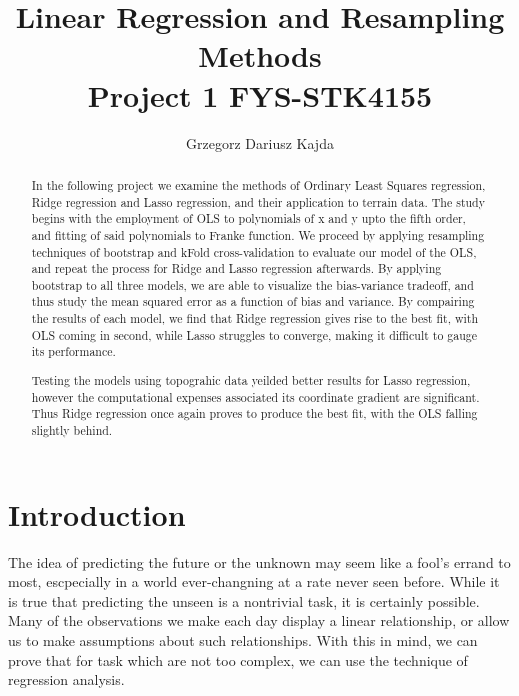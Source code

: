 \documentclass[a4paper, 10pt]{article}
\title{\Large Linear Regression and Resampling Methods \\	
		 \normalsize Project 1 FYS-STK4155}
\author{Grzegorz Dariusz Kajda}
\begin{document}
\maketitle

\begin{abstract}
	In the following project we examine the methods of Ordinary Least Squares regression, Ridge regression and Lasso regression, and their application to terrain data. The study begins with the employment of OLS to polynomials of x and y upto the fifth order, and fitting of said polynomials to Franke function. We proceed by applying resampling techniques of bootstrap and kFold cross-validation to evaluate our model of the OLS, and repeat the process for Ridge and Lasso regression afterwards. By applying bootstrap to all three models, we are able to visualize the bias-variance tradeoff, and thus study the mean squared error as a function of bias and variance. By compairing the results of each model, we find that Ridge regression gives rise to the best fit, with OLS coming in second, while Lasso struggles to converge, making it difficult to gauge its performance.

	Testing the models using topograhic data yeilded better results for Lasso regression, however the computational expenses associated its coordinate gradient are significant. Thus Ridge regression once again proves to produce the best fit, with the OLS falling slightly behind.      
\end{abstract}
\linespread{2.5}
\tableofcontents

\linespread{2.5}
\section{Introduction}
The idea of predicting the future or the unknown may seem like a fool's errand to most, escpecially in a world ever-changning at a rate never seen before. While it is true that predicting the unseen is a nontrivial task, it is certainly possible. Many of the observations we make each day display a linear relationship, or allow us to make assumptions about such relationships. With this in mind, we can prove that for task which are not too complex, we can use the technique of regression analysis.
\end{document}
